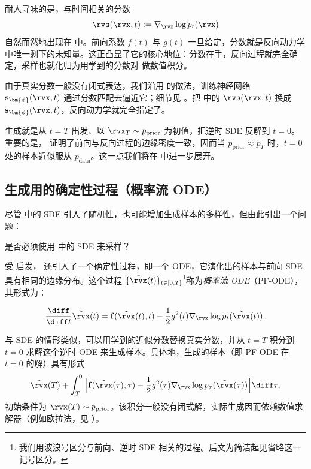 耐人寻味的是，与时间相关的分数
\[
\rvs(\rvx, t) := \nabla_{\rvx} \log p_t(\rvx)
\]
自然而然地出现在  中。前向系数 $f(t)$ 与 $g(t)$ 一旦给定，分数就是反向动力学中唯一剩下的未知量。这正凸显了它的核心地位：分数在手，反向过程就完全确定，采样也就化归为用学到的分数对  做数值积分。

由于真实分数一般没有闭式表达，我们沿用  的做法，训练神经网络 $\mathbf{s}_{\bm{\phi}}(\rvx, t)$ 通过分数匹配去逼近它；细节见 。把  中的 $\rvs(\rvx, t)$ 换成 $\mathbf{s}_{\bm{\phi}}(\rvx, t)$，反向动力学就完全指定了。

生成就是从 $t = T$ 出发、以 $\rvx_T \sim p_{\mathrm{prior}}$ 为初值，把逆时 SDE 反解到 $t = 0$。重要的是，\citet{anderson1982reverse} 证明了前向与反向过程的边缘密度一致，因而当 $p_{\mathrm{prior}} \approx p_T$ 时，$t=0$ 处的样本近似服从 $p_{\mathrm{data}}$。这一点我们将在  中进一步展开。


\subsection{生成用的确定性过程（概率流 ODE）}\label{subsec:pf-ode}
 尽管  中的 SDE 引入了随机性，也可能增加生成样本的多样性，但由此引出一个问题：
\begin{question}
    是否必须使用  中的 SDE 来采样？
\end{question}
受 \citet{maoutsa2020interacting} 启发，\citet{song2020score} 还引入了一个确定性过程，即一个 ODE，它演化出的样本与前向 SDE 具有相同的边缘分布。这个过程 $\{\tilde\rvx(t)\}_{t\in[0,T]}$\footnote{我们用波浪号区分与前向、逆时 SDE 相关的过程。后文为简洁起见省略这一记号区分。}称为\emph{概率流 ODE}（PF-ODE），其形式为：
\begin{mdframed}
    \begin{equation}\label{eq:prob_ode_gt}
    \frac{\diff}{\diff t}\tilde\rvx(t) = \mathbf{f}(\tilde\rvx(t), t) - \frac{1}{2} g^2(t) \nabla_{\rvx} \log p_t(\tilde\rvx(t)).
    \end{equation}
\end{mdframed}

与 SDE 的情形类似，可以用学到的近似分数替换真实分数，并从 $t = T$ 积分到 $t = 0$ 求解这个逆时 ODE 来生成样本。具体地，生成的样本（即 PF-ODE 在 $t=0$ 的解）具有形式
\[
\tilde\rvx(T) + \int_{T}^{0} \Big[ \mathbf{f}(\tilde\rvx(\tau), \tau) - \frac{1}{2} g^2(\tau)  \nabla_{\rvx} \log p_\tau(\tilde\rvx(\tau)) \Big]   \diff \tau,
\]
初始条件为 $\tilde\rvx(T) \sim p_{\mathrm{prior}}$。该积分一般没有闭式解，实际生成因而依赖数值求解器（例如欧拉法，见 ）。

